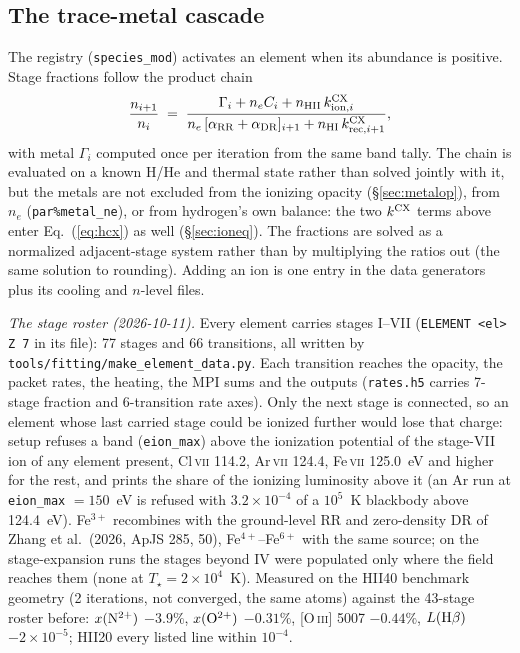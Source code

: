\documentclass[english,a4paper]{my_memo}
\newcommand{\code}[1]{\texttt{#1}}
\begin{document}
\subsection{The trace-metal cascade}
\label{sec:cascade}
The registry (\code{species\_mod}) activates an element when its
abundance is positive.  Stage fractions follow the product chain
\begin{equation}
  \frac{n_{i+1}}{n_i} \;=\;
  \frac{\Gamma_i + n_e C_i + n_{\rm HII}\,k^{\rm CX}_{{\rm ion},i}}
       {n_e\,[\alpha_{\rm RR} + \alpha_{\rm DR}]_{i+1}
        + n_{\rm HI}\,k^{\rm CX}_{{\rm rec},i+1}},
\end{equation}
with metal $\Gamma_i$ computed once per iteration from the same band
tally.  The chain is evaluated on a known H/He and thermal state rather
than solved jointly with it, but the metals are not excluded from the
ionizing opacity (\S\ref{sec:metalop}), from $n_e$
(\code{par\%metal\_ne}), or from hydrogen's own balance: the two
$k^{\rm CX}$ terms above enter Eq.~(\ref{eq:hcx}) as well
(\S\ref{sec:ioneq}).  The fractions are solved as a normalized
adjacent-stage system rather than by multiplying the ratios out (the same
solution to rounding).  Adding an ion is one entry in the data generators
plus its cooling and $n$-level files.

\emph{The stage roster (2026-10-11).}  Every element carries stages
I--VII (\code{ELEMENT <el> Z 7} in its file): 77 stages and 66
transitions, all written by \code{tools/fitting/make\_element\_data.py}.
Each transition reaches the opacity, the packet rates, the heating, the
MPI sums and the outputs (\code{rates.h5} carries 7-stage fraction and
6-transition rate axes).  Only the next stage is connected, so an element
whose last carried stage could be ionized further would lose that charge:
setup refuses a band (\code{eion\_max}) above the ionization potential of
the stage-VII ion of any element present, Cl\,\textsc{vii} 114.2,
Ar\,\textsc{vii} 124.4, Fe\,\textsc{vii} 125.0~eV and higher for the rest,
and prints the share of the ionizing luminosity above it (an Ar run at
\code{eion\_max} $= 150$~eV is refused with $3.2{\times}10^{-4}$ of a
$10^5$~K blackbody above 124.4~eV).  Fe$^{3+}$ recombines with the
ground-level RR and zero-density DR of Zhang et al.\ (2026, ApJS 285, 50),
Fe$^{4+}$--Fe$^{6+}$ with the same source; on the stage-expansion runs the
stages beyond IV were populated only where the field reaches them (none at
$T_\star = 2{\times}10^4$~K).  Measured on the HII40 benchmark geometry (2
iterations, not converged, the same atoms) against the 43-stage roster
before: $x({\rm N}^{2+})$ $-3.9\%$, $x({\rm O}^{2+})$ $-0.31\%$,
[O\,\textsc{iii}] 5007 $-0.44\%$, $L({\rm H}\beta)$ $-2{\times}10^{-5}$;
HII20 every listed line within $10^{-4}$.
\end{document}
